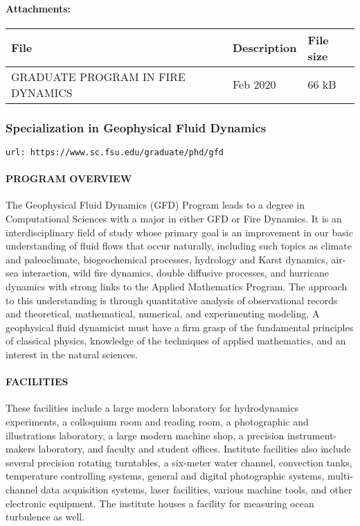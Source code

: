 \documentclass[12pt,a4paper]{article}
\begin{document}
\paragraph{Attachments:}
\begin{center}
\begin{tabular}{ l l l }
\hline
\textbf{File} & \textbf{Description} & \textbf{File size} \\
\hline
GRADUATE PROGRAM IN FIRE DYNAMICS & Feb 2020 & 66 kB \\
\hline
\end{tabular}
\end{center}

\subsubsection{Specialization in Geophysical Fluid Dynamics}
\texttt{url: https://www.sc.fsu.edu/graduate/phd/gfd}

\paragraph{PROGRAM OVERVIEW} The Geophysical Fluid Dynamics (GFD) Program leads to a degree in Computational Sciences with a major in either GFD or Fire Dynamics. It is an interdisciplinary field of study whose primary goal is an improvement in our basic understanding of fluid flows that occur naturally, including such topics as climate and paleoclimate, biogeochemical processes, hydrology and Karst dynamics, air-sea interaction, wild fire dynamics, double diffusive processes, and hurricane dynamics with strong links to the Applied Mathematics Program. The approach to this understanding is through quantitative analysis of observational records and theoretical, mathematical, numerical, and experimenting modeling. A geophysical fluid dynamicist must have a firm grasp of the fundamental principles of classical physics, knowledge of the techniques of applied mathematics, and an interest in the natural sciences.

\paragraph{FACILITIES} These facilities include a large modern laboratory for hydrodynamics experiments, a colloquium room and reading room, a photographic and illustrations laboratory, a large modern machine shop, a precision instrument-makers laboratory, and faculty and student offices. Institute facilities also include several precision rotating turntables, a six-meter water channel, convection tanks, temperature controlling systems, general and digital photographic systems, multi-channel data acquisition systems, laser facilities, various machine tools, and other electronic equipment. The institute houses a facility for measuring ocean turbulence as well.
\end{document}
